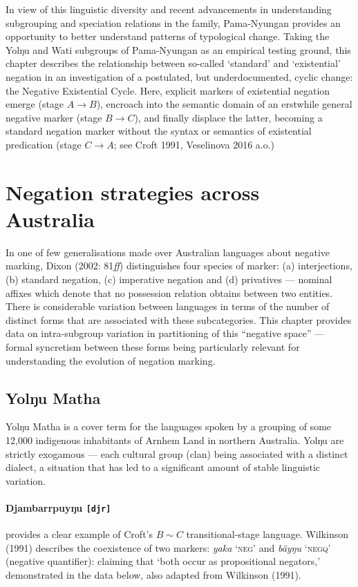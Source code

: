 \documentclass[10.5pt]{article}
\begin{document}
In view of this linguistic diversity and recent advancements in understanding subgrouping and speciation relations in the family, Pama-Nyungan provides an opportunity to better understand patterns of typological change. Taking the Yolŋu and Wati subgroups of Pama-Nyungan as an empirical testing ground, this chapter describes the relationship between so-called `standard' and `existential' negation in an investigation of a postulated, but underdocumented, cyclic change: the Negative Existential Cycle. Here, explicit markers of existential negation emerge (stage $A\to B$), encroach into the semantic domain of an erstwhile general negative marker (stage $B\to C$), and finally displace the latter, becoming a standard negation marker without the syntax or semantics of existential predication (stage $C\to A$; see Croft 1991, Veselinova 2016 a.o.)

\section*{Negation strategies across Australia}

In one of few generalisations made over Australian languages about negative marking, Dixon (2002: 81\textit{ff}) distinguishes four species of marker: (a) interjections, (b) standard negation, (c) imperative negation and (d) privatives --- nominal affixes which denote that no possession relation obtains between two entities. There is considerable variation between languages in terms of the number of distinct forms that are associated with these subcategories. This chapter provides data on intra-subgroup variation in partitioning of this ``negative space'' --- formal syncretism between these forms being particularly relevant for understanding the evolution of negation marking.

\subsection*{Yolŋu Matha}
Yolŋu Matha is a cover term for the languages spoken by a grouping of some 12,000 indigenous inhabitants of Arnhem Land in northern Australia. Yolŋu are strictly exogamous --- each cultural group (clan) being associated with a distinct dialect, a situation that has led to a significant amount of stable linguistic variation.

\paragraph{Djambarrpuyŋu {\tt[djr]}} provides a clear example of Croft's $B\sim C$ transitional-stage language. Wilkinson (1991) describes the coexistence of two markers: \textit{yaka} `\textsc{neg}' and \textit{bäyŋu} \textsc{`negq'} (negative quantifier): claiming that `both occur as propositional negators,' demonstrated in the data below, also adapted from Wilkinson (1991).
\end{document}
